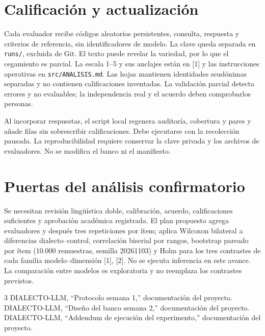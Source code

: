 \documentclass[conference]{IEEEtran}
\begin{document}
\section{Calificación y actualización}
Cada evaluador recibe códigos aleatorios persistentes, consulta, respuesta y criterios de referencia, sin identificadores de modelo. La clave queda separada en \texttt{runs/}, excluida de Git. El texto puede revelar la variedad, por lo que el cegamiento es parcial. La escala 1--5 y sus anclajes están en [1] y las instrucciones operativas en \texttt{src/ANALISIS.md}. Las hojas mantienen identidades seudónimas separadas y no contienen calificaciones inventadas. La validación parcial detecta errores y no evaluables; la independencia real y el acuerdo deben comprobarlos personas.

Al incorporar respuestas, el script local regenera auditoría, cobertura y pares y añade filas sin sobrescribir calificaciones. Debe ejecutarse con la recolección pausada. La reproducibilidad requiere conservar la clave privada y los archivos de evaluadores. No se modifica el banco ni el manifiesto.
\section{Puertas del análisis confirmatorio}
Se necesitan revisión lingüística doble, calibración, acuerdo, calificaciones suficientes y aprobación académica registrada. El plan propuesto agrega evaluadores y después tres repeticiones por ítem; aplica Wilcoxon bilateral a diferencias dialecto--control, correlación biserial por rangos, bootstrap pareado por ítem (10.000 remuestras, semilla 20261103) y Holm para los tres contrastes de cada familia modelo--dimensión [1], [2]. No se ejecuta inferencia en este avance. La comparación entre modelos es exploratoria y no reemplaza los contrastes previstos.
\begin{thebibliography}{3}
 DIALECTO-LLM, ``Protocolo semana 1,'' documentación del proyecto.
 DIALECTO-LLM, ``Diseño del banco semana 2,'' documentación del proyecto.
 DIALECTO-LLM, ``Addendum de ejecución del experimento,'' documentación del proyecto.
\end{thebibliography}
\end{document}
